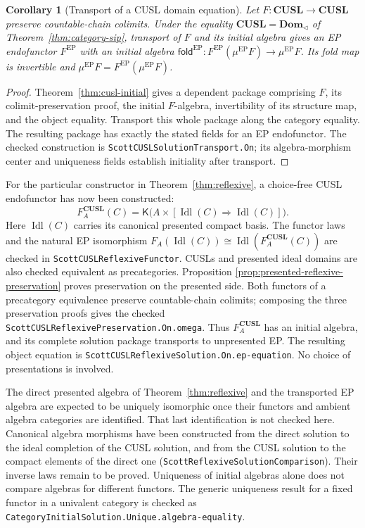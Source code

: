 \documentclass[11pt,a4paper]{article}
\newtheorem{corollary}[theorem]{Corollary}
\theoremstyle{definition}
\theoremstyle{remark}
\newcommand{\K}{\mathsf K}
\newcommand{\Cont}[2]{[#1\mathbin{\Rightarrow}#2]}
\begin{document}
\begin{corollary}[Transport of a CUSL domain equation]
\label{cor:cusl-solution-transport}
Let $F:\mathbf{CUSL}\to\mathbf{CUSL}$ preserve countable-chain
colimits. Under the equality
$\mathbf{CUSL}=\mathbf{Dom}_{\triangleleft}$ of
Theorem~\ref{thm:category-sip}, transport of $F$ and its initial algebra
gives an EP endofunctor $F^{\mathrm{EP}}$ with an initial algebra
$\mathsf{fold}^{\mathrm{EP}}:F^{\mathrm{EP}}(\mu^{\mathrm{EP}}F)
\to\mu^{\mathrm{EP}}F$. Its fold map is invertible and
$\mu^{\mathrm{EP}}F=F^{\mathrm{EP}}(\mu^{\mathrm{EP}}F)$.
\end{corollary}
\begin{proof}
Theorem~\ref{thm:cusl-initial} gives a dependent package comprising
$F$, its colimit-preservation proof, the initial $F$-algebra, invertibility
of its structure map, and the object equality. Transport this whole
package along the category equality. The resulting package has exactly
the stated fields for an EP endofunctor. The checked construction is
\texttt{ScottCUSLSolutionTransport.On}; its algebra-morphism center and
uniqueness fields establish initiality after transport.
\end{proof}

For the particular constructor in Theorem~\ref{thm:reflexive}, a
choice-free CUSL endofunctor has now been constructed:
\[
  F_A^{\mathbf{CUSL}}(C)
   =\K\bigl(A\times\Cont{\operatorname{Idl}(C)}
                         {\operatorname{Idl}(C)}\bigr).
\]
Here $\operatorname{Idl}(C)$ carries its canonical presented compact
basis. The functor laws and the natural EP isomorphism
$F_A(\operatorname{Idl}(C))\cong
 \operatorname{Idl}(F_A^{\mathbf{CUSL}}(C))$
are checked in \texttt{ScottCUSLReflexiveFunctor}. CUSLs and presented
ideal domains are also checked equivalent as precategories. Proposition
\ref{prop:presented-reflexive-preservation} proves preservation on the
presented side. Both functors of a precategory equivalence preserve
countable-chain colimits; composing the three preservation proofs gives
the checked \texttt{ScottCUSLReflexivePreservation.On.omega}. Thus
$F_A^{\mathbf{CUSL}}$ has an initial algebra, and its complete solution
package transports to unpresented EP. The resulting object equation is
\texttt{ScottCUSLReflexiveSolution.On.ep-equation}. No choice of
presentations is involved.

The direct presented algebra of Theorem~\ref{thm:reflexive} and the
transported EP algebra are expected to be uniquely isomorphic once their
functors and ambient algebra categories are identified. That last
identification is not checked here. Canonical algebra morphisms have been
constructed from the direct solution to the ideal completion of the CUSL
solution, and from the CUSL solution to the compact elements of the direct
one (\texttt{ScottReflexiveSolutionComparison}). Their inverse laws remain
to be proved. Uniqueness of initial algebras alone
does not compare algebras for different functors. The generic uniqueness
result for a fixed functor in a univalent category is checked as
\texttt{CategoryInitialSolution.Unique.algebra-equality}.
\end{document}

